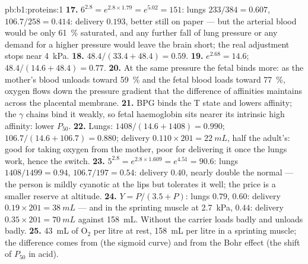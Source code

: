 \begin{solution}{pb:b1:proteins:1}
\textbf{17.} $6^{2.8} = e^{2.8\times 1.79} = e^{5.02} = 151$: lungs
$233/384 = 0.607$,  $106.7/258 = 0.414$: delivery $0.193$,
better still on paper --- but the arterial blood would be only
\qty{61}{\%} saturated, and any further fall of lung pressure or any
demand for a higher  pressure would leave the brain short; the
real adjustment stops near \qty{4}{kPa}.
\textbf{18.} $48.4/(33.4 + 48.4) = 0.59$.
\textbf{19.} $e^{2.68} = 14.6$; $48.4/(14.6 + 48.4) = 0.77$.
\textbf{20.} At the same pressure the fetal  binds more: as the
mother's blood unloads toward \qty{59}{\%} and the fetal blood loads
toward \qty{77}{\%}, oxygen flows down the pressure gradient that the
difference of affinities maintains across the placental membrane.
\textbf{21.} BPG binds the T state and lowers affinity; the $\gamma$
chains bind it weakly, so fetal haemoglobin sits nearer its intrinsic
high affinity: lower $P_{50}$.
\textbf{22.} Lungs: $1408/(14.6 + 1408) = 0.990$;  $106.7/(14.6
+ 106.7) = 0.880$; delivery $0.110\times 201 = \qty{22}{mL}$, half the
adult's: good for taking oxygen from the mother, poor for delivering
it once the lungs work, hence the switch.
\textbf{23.} $5^{2.8} = e^{2.8\times 1.609} = e^{4.51} = 90.6$: lungs
$1408/1499 = 0.94$,  $106.7/197 = 0.54$: delivery $0.40$, nearly
double the normal --- the person is mildly cyanotic at the lips but
tolerates it well; the price is a smaller reserve at altitude.
\textbf{24.} $Y = P/(3.5 + P)$: lungs $0.79$,  $0.60$: delivery
$0.19\times 201 = \qty{38}{mL}$ --- and in the sprinting muscle at
\qty{2.7}{kPa}, $0.44$: delivery $0.35\times 201 = \qty{70}{mL}$ against
\qty{158}{mL}. Without  the carrier loads badly and
unloads badly.
\textbf{25.} \qty{43}{mL} of $\mathrm{O_2}$ per litre at rest,
\qty{158}{mL} per litre in a sprinting muscle; the difference comes
from  (the sigmoid curve) and from the Bohr effect (the
shift of $P_{50}$ in acid).
\end{solution}
